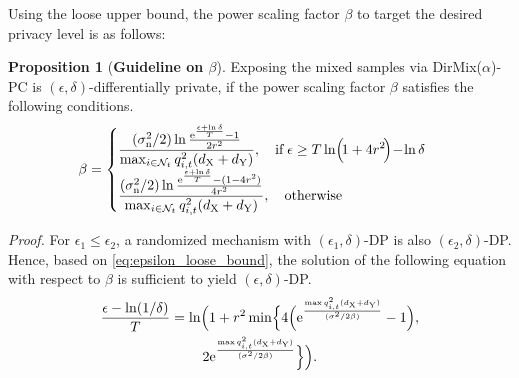 \documentclass[conference,10pt]{IEEEtran}
\theoremstyle{definition}
\theoremstyle{definition}
\newtheorem{proposition}{Proposition}
\begin{document}
Using the loose upper bound, the power scaling factor $\beta$ to target the desired privacy level is as follows:
\begin{proposition}[\textbf{Guideline on $\beta$}]
	\label{proposition:beta_DP_setting}
	Exposing the mixed samples via \textsf{DirMix($\alpha$)-PC} is $(\epsilon, \delta)$-differentially private, if the power scaling factor $\beta$ satisfies the following conditions.
	\begin{align}
		 & \beta  =      \begin{cases}
			\label{eq:beta_DP_setting}
			 & \hspace{-10pt} \displaystyle\frac{(\sigma_{\mathrm{n}}^2/2) \ln \frac{ \mathrm{e}^{\frac{\epsilon + \ln \delta}{T}} - 1}{2r^2}}{\max_{i\in\mathcal{N}_t} q^2_{i, t}(d_{\mathrm{X}} + d_{\mathrm{Y}})} ,         \quad \text{if}\; \epsilon \geq T \ln \Bigl(\!1 + 4r^2\!\Bigr) \!-\! \ln\delta \\
			 & \hspace{-10pt} \displaystyle\frac{(\sigma_{\mathrm{n}}^2/2) \ln\frac{\mathrm{e}^{\frac{\epsilon + \ln \delta}{T}} - (1 - 4r^2)}{4r^2}}{\max_{i\in\mathcal{N}_t} q^2_{i, t}(d_{\mathrm{X}} + d_{\mathrm{Y}})} , \quad \text{otherwise}
		\end{cases}
	\end{align}

	\vspace{-1em}\noindent \textit{Proof.} For $\epsilon_1 \leq \epsilon_2$, a randomized mechanism with $(\epsilon_1, \delta)$-DP is also $(\epsilon_2, \delta)$-DP.
	Hence, based on \eqref{eq:epsilon_loose_bound}, the solution of the following equation with respect to $\beta$ is sufficient to yield $(\epsilon, \delta)$-DP.
	\begin{multline}
		\frac{\epsilon - \ln(1/\delta)}{T} = \ln\Bigl(1 + r^2 \min\Bigl\{4\Bigl(\mathrm{e}^{\frac{\max q^2_{i, t}(d_{\mathrm{X}} + d_{\mathrm{Y}})}{(\sigma^2/2\beta)}} - 1\Bigr), \\
		2\mathrm{e}^{\frac{\max q^2_{i, t}(d_{\mathrm{X}} + d_{\mathrm{Y}})}{(\sigma^2/2\beta)}}\Bigl\}\Bigr).
	\end{multline}
\end{proposition}
\end{document}
